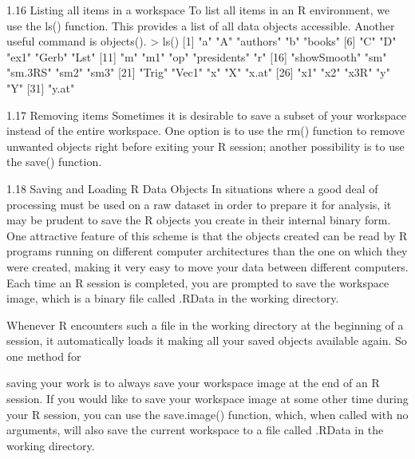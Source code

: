 \documentclass{beamer}
\begin{document}
	\begin{frame}
		
		1.16 Listing all items in a workspace
		To list all items in an R environment, we use the ls() function. This provides a list of all data
		objects accessible. Another useful command is objects().
		> ls()
		[1] "a" "A" "authors" "b" "books"
		[6] "C" "D" "ex1" "Gerb" "Lst"
		[11] "m" "m1" "op" "presidents" "r"
		[16] "showSmooth" "sm" "sm.3RS" "sm2" "sm3"
		[21] "Trig" "Vec1" "x" "X" "x.at"
		[26] "x1" "x2" "x3R" "y" "Y"
		[31] "y.at"
	\end{frame}
	\begin{frame}
		
		1.17 Removing items
		Sometimes it is desirable to save a subset of your workspace instead of the entire workspace.
		One option is to use the rm() function to remove unwanted objects right before exiting your R
		session; another possibility is to use the save() function.
		
	\end{frame}
	\begin{frame}
		1.18 Saving and Loading R Data Objects
		In situations where a good deal of processing must be used on a raw dataset in order to prepare
		it for analysis, it may be prudent to save the R objects you create in their internal binary form.
		One attractive feature of this scheme is that the objects created can be read by R programs
		running on different computer architectures than the one on which they were created, making it
		very easy to move your data between different computers. Each time an R session is completed,
		you are prompted to save the workspace image, which is a binary file called .RData in the
		working directory.
	\end{frame}
	\begin{frame}
		Whenever R encounters such a file in the working directory at the beginning of a session,
		it automatically loads it making all your saved objects available again. So one method for
		
		saving your work is to always save your workspace image at the end of an R session. If you
		would like to save your workspace image at some other time during your R session, you can use
		the save.image() function, which, when called with no arguments, will also save the current
		workspace to a file called .RData in the working directory.

	\end{frame}
\end{document}

